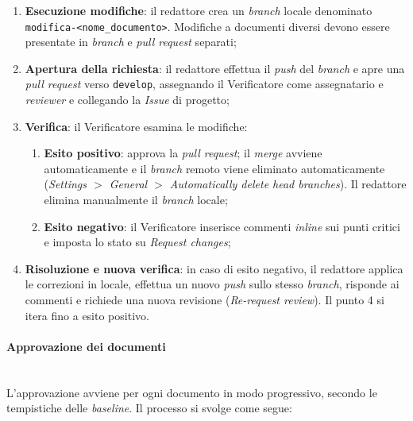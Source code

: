 \documentclass[10pt, letterpaper]{article}
\newcommand{\trisubsection}[1]{\paragraph{#1}\mbox{}\\}
\begin{document}
\begin{enumerate}
    \item \textbf{Esecuzione modifiche}: il redattore crea un \textit{branch} locale denominato \texttt{modifica-<nome\_documento>}. Modifiche a documenti diversi devono essere presentate in \textit{branch} e \textit{pull request} separati;
    \item \textbf{Apertura della richiesta}: il redattore effettua il \textit{push} del \textit{branch} e apre una \textit{pull request} verso \texttt{develop}, assegnando il Verificatore come assegnatario e \textit{reviewer} e collegando la \textit{Issue} di progetto;
    \item \textbf{Verifica}: il Verificatore esamina le modifiche:
    \begin{enumerate}
        \item \textbf{Esito positivo}: approva la \textit{pull request}; il \textit{merge} avviene automaticamente e il \textit{branch} remoto viene eliminato automaticamente (\textit{Settings $>$ General $>$ Automatically delete head branches}). Il redattore elimina manualmente il \textit{branch} locale;
        \item \textbf{Esito negativo}: il Verificatore inserisce commenti \textit{inline} sui punti critici e imposta lo stato su \textit{Request changes};
    \end{enumerate}
    \item \textbf{Risoluzione e nuova verifica}: in caso di esito negativo, il redattore applica le correzioni in locale, effettua un nuovo \textit{push} sullo stesso \textit{branch}, risponde ai commenti e richiede una nuova revisione (\textit{Re-request review}). Il punto 4 si itera fino a esito positivo.
\end{enumerate}

\trisubsection{Approvazione dei documenti}
\label{sec:Approvazione}
L'approvazione avviene per ogni documento in modo progressivo, secondo le tempistiche delle \textit{baseline}. Il processo si svolge come segue:
\end{document}
